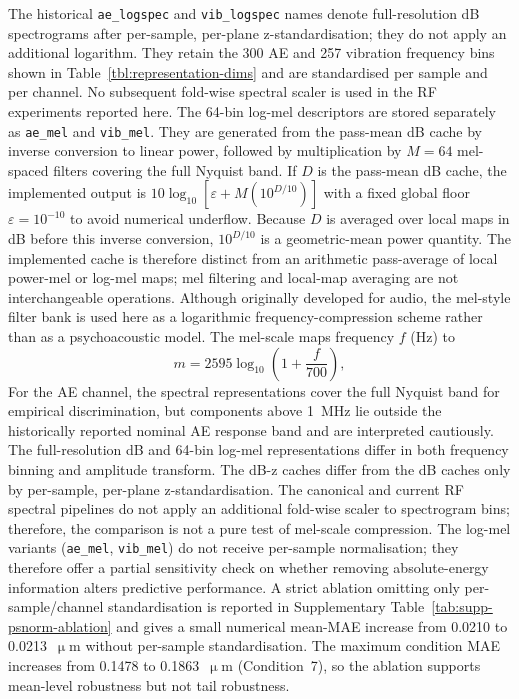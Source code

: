 The historical \texttt{ae\_logspec} and \texttt{vib\_logspec} names denote
full-resolution dB spectrograms after per-sample, per-plane z-standardisation;
they do not apply an additional logarithm. They retain the 300 AE and
257 vibration frequency bins shown in Table~\ref{tbl:representation-dims}
and are standardised per sample and per channel. No subsequent fold-wise
spectral scaler is used in the RF experiments reported here. The 64-bin
log-mel descriptors are stored separately as \texttt{ae\_mel} and
\texttt{vib\_mel}. They are generated from the pass-mean dB cache by inverse
conversion to linear power, followed by multiplication by $M=64$ mel-spaced
filters covering the full Nyquist band. If $D$ is the pass-mean dB cache, the
implemented output is $10\log_{10}[\varepsilon + M(10^{D/10})]$ with a fixed global floor
$\varepsilon = 10^{-10}$ to avoid numerical underflow.
Because \(D\) is averaged over local maps in dB before this inverse
conversion, \(10^{D/10}\) is a geometric-mean power quantity. The implemented
cache is therefore distinct from an arithmetic pass-average of local
power-mel or log-mel maps; mel filtering and local-map averaging are not
interchangeable operations. Although originally
developed for audio, the mel-style filter bank is used here as a
logarithmic frequency-compression scheme rather than as a psychoacoustic
model. The mel-scale maps frequency $f$ (Hz) to
\begin{equation}
m = 2595 \log_{10}\!\left(1 + \frac{f}{700}\right),
\label{eq:mel}
\end{equation}
For the AE channel, the spectral representations cover the full Nyquist
band for empirical discrimination, but components above 1~MHz lie outside
the historically reported nominal AE response band and are interpreted
cautiously.
The full-resolution dB and 64-bin log-mel representations differ in both
frequency binning and amplitude transform. The dB-z caches differ from the
dB caches only by per-sample, per-plane z-standardisation. The canonical and
current RF spectral pipelines do not apply an additional fold-wise scaler to
spectrogram bins; therefore, the comparison is not a pure test of
mel-scale compression. The log-mel
variants (\texttt{ae\_mel}, \texttt{vib\_mel}) do not receive
per-sample normalisation; they therefore offer a partial sensitivity check
on whether removing absolute-energy information alters predictive
performance. A strict ablation omitting only per-sample/channel standardisation
is reported in Supplementary
Table~\ref{tab:supp-psnorm-ablation} and gives a small numerical mean-MAE
increase from 0.0210 to 0.0213~\(\upmu\)m without per-sample
standardisation. The maximum condition MAE increases from 0.1478 to
0.1863~\(\upmu\)m (Condition~7), so the ablation supports
mean-level robustness but not tail robustness.

